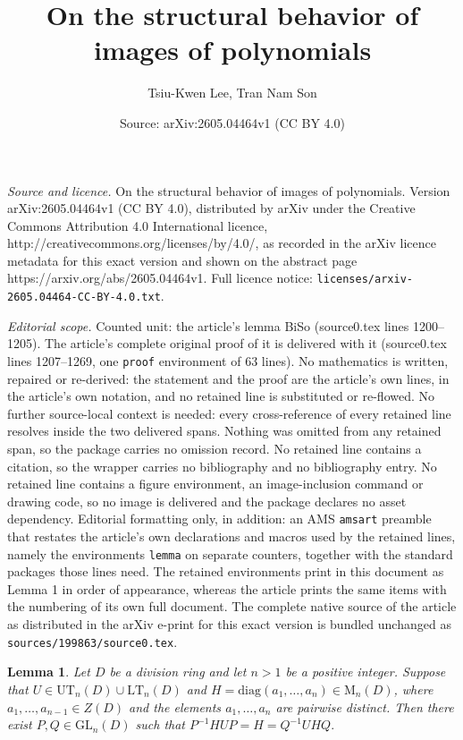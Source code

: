 \documentclass[10pt,a4paper]{amsart}
\title{\Large On the structural behavior of images of polynomials}
\author{Tsiu-Kwen Lee, Tran Nam Son}
\date{Source: arXiv:2605.04464v1 (CC BY 4.0)}
\newtheorem{lemma}{Lemma}
\begin{document}
\maketitle

\noindent\emph{Source and licence.} \Large On the structural behavior of images of polynomials. Version arXiv:2605.04464v1 (CC BY 4.0), distributed by arXiv under the Creative Commons Attribution 4.0 International licence, http://creativecommons.org/licenses/by/4.0/, as recorded in the arXiv licence metadata for this exact version and shown on the abstract page https://arxiv.org/abs/2605.04464v1. Full licence notice: \texttt{licenses/arxiv-2605.04464-CC-BY-4.0.txt}.\par\smallskip

\noindent\textit{Editorial scope.} Counted unit: the article's lemma BiSo (source0.tex lines 1200--1205). The article's complete original proof of it is delivered with it (source0.tex lines 1207--1269, one \texttt{proof} environment of 63 lines). No mathematics is written, repaired or re-derived: the statement and the proof are the article's own lines, in the article's own notation, and no retained line is substituted or re-flowed.  No further source-local context is needed: every cross-reference of every retained line resolves inside the two delivered spans.  Nothing was omitted from any retained span, so the package carries no omission record.  No retained line contains a citation, so the wrapper carries no bibliography and no bibliography entry.  No retained line contains a figure environment, an image-inclusion command or drawing code, so no image is delivered and the package declares no asset dependency.  Editorial formatting only, in addition: an AMS \texttt{amsart} preamble that restates the article's own declarations and macros used by the retained lines, namely the environments \texttt{lemma} on separate counters, together with the standard packages those lines need.  The retained environments print in this document as Lemma 1 in order of appearance, whereas the article prints the same items with the numbering of its own full document.  The complete native source of the article as distributed in the arXiv e-print for this exact version is bundled unchanged as \texttt{sources/199863/source0.tex}.
				\begin{lemma}\label{BiSo}
					Let \( D \) be a division ring and let \( n >1  \) be a positive integer. Suppose that \( U \in \mathrm{UT}_n(D) \cup \mathrm{LT}_n(D) \) and \( H = \mathrm{diag}(a_1, \ldots, a_n) \in \mathrm{M}_n(D) \), where \( a_1, \ldots, a_{n-1} \in Z(D) \) and the elements \( a_1, \ldots, a_n \) are pairwise distinct. Then there exist \( P, Q \in \mathrm{GL}_n(D) \) such that
					$
					P^{-1} H U P = H = Q^{-1} U H Q.
					$
				\end{lemma}
\end{document}
